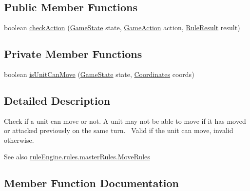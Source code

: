 \subsection*{Public Member Functions}
\begin{DoxyCompactItemize}
\item 
boolean \mbox{\hyperlink{classrule_engine_1_1rules_1_1atomic_rules_1_1_check_can_move_unit_a32b0bde0deb256a30ca98f9fb393def0}{check\+Action}} (\mbox{\hyperlink{classgame_1_1game_state_1_1_game_state}{Game\+State}} state, \mbox{\hyperlink{classrule_engine_1_1_game_action}{Game\+Action}} action, \mbox{\hyperlink{classrule_engine_1_1_rule_result}{Rule\+Result}} result)
\end{DoxyCompactItemize}
\subsection*{Private Member Functions}
\begin{DoxyCompactItemize}
\item 
boolean \mbox{\hyperlink{classrule_engine_1_1rules_1_1atomic_rules_1_1_check_can_move_unit_aecbc116d3a1af14548f7aa75533b23be}{is\+Unit\+Can\+Move}} (\mbox{\hyperlink{classgame_1_1game_state_1_1_game_state}{Game\+State}} state, \mbox{\hyperlink{classrule_engine_1_1_coordinates}{Coordinates}} coords)
\end{DoxyCompactItemize}


\subsection{Detailed Description}
Check if a unit can move or not. A unit may not be able to move if it has moved or attacked previously on the same turn.~\newline
 Valid if the unit can move, invalid otherwise.

\begin{DoxySeeAlso}{See also}
\mbox{\hyperlink{classrule_engine_1_1rules_1_1master_rules_1_1_move_rules}{rule\+Engine.\+rules.\+master\+Rules.\+Move\+Rules}} 
\end{DoxySeeAlso}


\subsection{Member Function Documentation}
\mbox{\label{classrule_engine_1_1rules_1_1atomic_rules_1_1_check_can_move_unit_a32b0bde0deb256a30ca98f9fb393def0}} 

